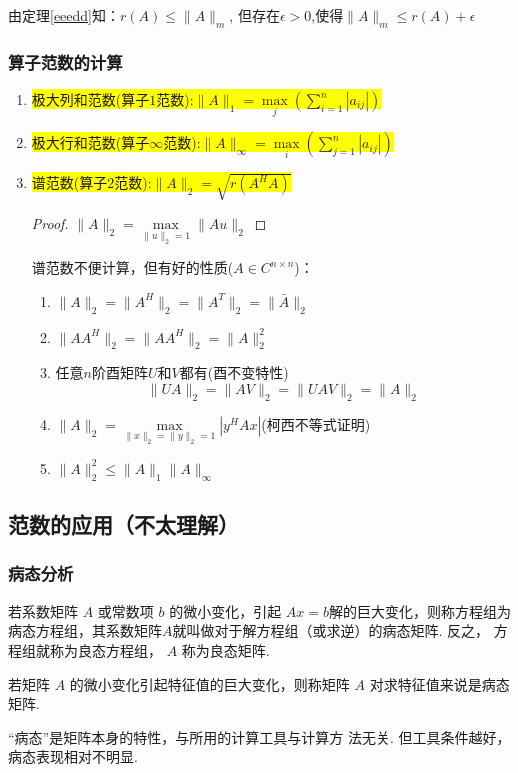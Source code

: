 由定理\ref{eeedd}知：$r(A)\leq\|A\|_m$, 但存在$\epsilon>0$,使得$\|A\|_m\leq r(A)+\epsilon $

\subsubsection{算子范数的计算}
	 \begin{enumerate}
	\item \colorbox{yellow}{极大列和范数(算子$1$范数):$\|A\|_1=\max\limits_{j}\left( \sum\limits_{i=1}^{n}|a_{ij}|\right)$}
	\item \colorbox{yellow}{极大行和范数(算子$\infty$范数):$\|A\|_\infty=\max\limits_{i}\left( \sum\limits_{j=1}^{n}|a_{ij}|\right)$}
	\item \colorbox{yellow}{谱范数(算子$2$范数):$\|A\|_2=\sqrt{r(A^HA)}$}
	\begin{proof}
	$\|A\|_2=\max\limits_{\|u\|_2=1}\|Au\|_2 $
	
\end{proof}
	谱范数不便计算，但有好的性质($A\in C^{n\times n}$)：
	 \begin{enumerate}
	 	\item $\|A\|_2=\|A^H\|_2=\|A^T\|_2=\|\bar{A}\|_2$
	 	\item $\|AA^H\|_2=\|AA^H\|_2=\|A\|_2^2$
	 	\item 任意$n$阶酉矩阵$U$和$V$都有(酉不变特性)
	 	\[
	 	\|UA\|_2=\|AV\|_2=\|UAV\|_2=\|A\|_2
	 	\]
	 	\item $\|A\|_2=\max\limits_{\|x\|_2=\|y\|_2=1}|y^HAx|$(柯西不等式证明)
	 	\item $\|A\|_2^2\leq \|A\|_1\|A\|_\infty$
	 \end{enumerate}
\end{enumerate}

\subsection{范数的应用（不太理解）}
\subsubsection{病态分析}
若系数矩阵 $A$ 或常数项 $b$ 的微小变化，引起 $Ax= b$解的巨大变化，则称方程组为病态方程组，其系数矩阵$A$就叫做对于解方程组（或求逆）的病态矩阵. 反之， 方程组就称为良态方程组， $A$ 称为良态矩阵.

若矩阵 $A$ 的微小变化引起特征值的巨大变化，则称矩阵 $A$
对求特征值来说是病态矩阵.

“病态”是矩阵本身的特性，与所用的计算工具与计算方
法无关. 但工具条件越好，病态表现相对不明显.

